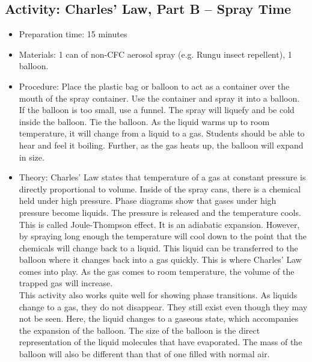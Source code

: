 \begin{itemize}
{\begin{itemize}
\begin{itemize}
{\subsection{Activity: Charles’ Law, Part B – Spray Time}
\begin{itemize}
\item{Preparation time: 15 minutes}
\item{Materials: 1 can of non-CFC aerosol spray (e.g. Rungu insect repellent), 1 balloon.}
\item{Procedure: Place the plastic bag or balloon to act as a container over the mouth of the spray container. Use the container and spray it into a balloon. If the balloon is too small, use a funnel. The spray will liquefy and be cold inside the balloon. Tie the balloon. As the liquid warms up to room temperature, it will change from a liquid to a gas. Students should be able to hear and feel it boiling. Further, as the gas heats up, the balloon will expand in size.}
\item{Theory: Charles’ Law states that temperature of a gas at constant pressure is directly proportional to volume. Inside of the spray cans, there is a chemical held under high pressure. Phase diagrams show that gases under high pressure become liquids. The pressure is released and the temperature cools. This is called Joule-Thompson effect. It is an adiabatic expansion. However, by spraying long enough the temperature will cool down to the point that the chemicals will change back to a liquid. This liquid can be transferred to the balloon where it changes back into a gas quickly. This is where Charles’ Law comes into play. As the gas comes to room temperature, the volume of the trapped gas will increase.\\
This activity also works quite well for showing phase transitions. As liquids change to a gas, they do not disappear. They still exist even though they may not be seen. Here, the liquid changes to a gaseous state, which accompanies the expansion of the balloon. The size of the balloon is the direct representation of the liquid molecules that have evaporated. The mass of the balloon will also be different than that of one filled with normal air.}
\end{itemize}

}
\end{itemize}
\end{itemize}}
\end{itemize}
